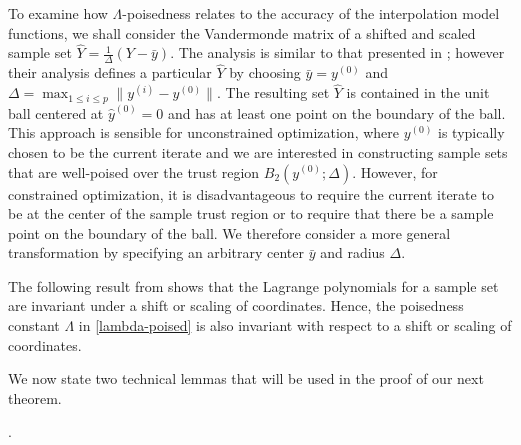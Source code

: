 \documentclass{article}
\begin{document}
To examine how $\Lambda$-poisedness relates to the accuracy of the interpolation model functions, we shall consider the Vandermonde matrix of a shifted and scaled sample set $\hat{Y} = \frac{1}{\Delta}(Y-\bar{y})$.  The analysis is similar to that presented in \cite{introduction_book}; however their analysis defines a particular  $\hat{Y}$ by choosing $\bar{y} = y^{(0)}$ and $\Delta = \max_{1 \le i \le p} \| y^{(i)}-y^{(0)}\|$.  The resulting set $\hat{Y}$  is contained in the unit ball centered at $\hat{y}^{(0)} = 0$ and has at least one point on the boundary of the ball.    This approach is sensible for unconstrained optimization, where  $y^{(0)}$ is typically chosen to be the current iterate and we are interested in constructing sample sets that are well-poised over the trust region $B_2(y^{(0)};\Delta)$.    However, for constrained optimization,  it is disadvantageous to require the current iterate to be at the center of the sample trust region or to require that there be a sample point on the boundary of the ball.   We therefore consider a more general transformation by specifying an arbitrary center $\bar{y}$ and radius $\Delta$.  

The following result from \cite[Lemmas 3.8 \& 3.9]{introduction_book} shows that the
Lagrange polynomials for a sample set are invariant under a shift or scaling of coordinates.     Hence, the poisedness constant  $\Lambda$ in \cref{lambda-poised}  is also invariant  with respect to a shift or scaling of coordinates. 




 

We now state two technical lemmas that will be used in the proof of our next theorem.

.
\end{document}
